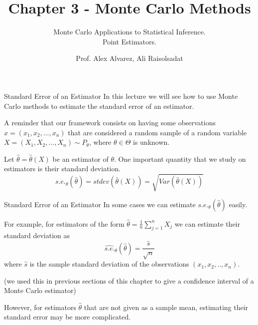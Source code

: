 \documentclass[8pt]{beamer}
\title{Chapter 3 - Monte Carlo Methods}
\subtitle{Monte Carlo Applications to Statistical Inference.\\ Point Estimators.}
\author{Prof. Alex Alvarez, Ali Raisolsadat}
\institute{School of Mathematical and Computational Sciences \\ University of Prince Edward Island}
\date{} %
\begin{document}
\maketitle

\begin{frame}{Standard Error of an Estimator}
In this lecture we will see how to use Monte Carlo methods to estimate the standard error of an estimator.

\vspace{3mm}

A reminder that our framework consists on having some observations $x=(x_1,x_2,...,x_n)$ that are considered a random sample of a random variable $X=(X_1,X_2,...,X_n)\sim P_{\theta}$, where $\theta \in \Theta$
is unknown.

\vspace{3mm}

Let $\hat{\theta}=\hat{\theta}(X)$ be an estimator of $\theta$. One important quantity that we study on estimators is their standard deviation.
\begin{equation*}
s.e._{\theta}(\hat{\theta})=stdev\left(\hat{\theta}(X)\right)=\sqrt{Var\left(\hat{\theta}(X) \right)}
\end{equation*}
\end{frame}

\begin{frame}{Standard Error of an Estimator}
In some cases we can estimate $s.e._{\theta}(\hat{\theta})$ easily.
\vspace{3mm}

For example, for estimators of the form $\hat{\theta}=\frac{1}{n} \sum_{j=1}^n X_j$ we can estimate their standard deviation as 
\begin{equation*}
\widehat{s.e.}_{\theta}(\hat{\theta})=\frac{\hat{s}}{\sqrt{n}}
\end{equation*}
where $\hat{s}$ is the sample standard deviation of the observations $(x_1,x_2,..,x_n)$.

\vspace{3mm}

(we used this in previous sections of this chapter to give a confidence interval of a Monte Carlo estimator)

\vspace{3mm}

However, for estimators $\hat{\theta}$ that are not given as a sample mean, estimating their standard error may be more complicated.
\end{frame}
\end{document}
